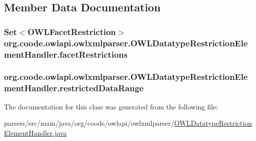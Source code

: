 \subsection{Member Data Documentation}
\hypertarget{classorg_1_1coode_1_1owlapi_1_1owlxmlparser_1_1_o_w_l_datatype_restriction_element_handler_ae6bf937a22a5df32098a78f64a61f6e1}{
\subsubsection[{facet\-Restrictions}]{\setlength{\rightskip}{0pt plus 5cm}Set$<${\bf O\-W\-L\-Facet\-Restriction}$>$ org.\-coode.\-owlapi.\-owlxmlparser.\-O\-W\-L\-Datatype\-Restriction\-Element\-Handler.\-facet\-Restrictions\hspace{0.3cm}{\ttfamily [private]}}}\label{classorg_1_1coode_1_1owlapi_1_1owlxmlparser_1_1_o_w_l_datatype_restriction_element_handler_ae6bf937a22a5df32098a78f64a61f6e1}
\hypertarget{classorg_1_1coode_1_1owlapi_1_1owlxmlparser_1_1_o_w_l_datatype_restriction_element_handler_af85fa76c23bbbcc422adfd0a4ba0e414}{
\subsubsection[{restricted\-Data\-Range}]{ org.\-coode.\-owlapi.\-owlxmlparser.\-O\-W\-L\-Datatype\-Restriction\-Element\-Handler.\-restricted\-Data\-Range\hspace{0.3cm}{\ttfamily [private]}}}\label{classorg_1_1coode_1_1owlapi_1_1owlxmlparser_1_1_o_w_l_datatype_restriction_element_handler_af85fa76c23bbbcc422adfd0a4ba0e414}


The documentation for this class was generated from the following file\-:\begin{DoxyCompactItemize}
\item 
parsers/src/main/java/org/coode/owlapi/owlxmlparser/\hyperlink{_o_w_l_datatype_restriction_element_handler_8java}{O\-W\-L\-Datatype\-Restriction\-Element\-Handler.\-java}\end{DoxyCompactItemize}
